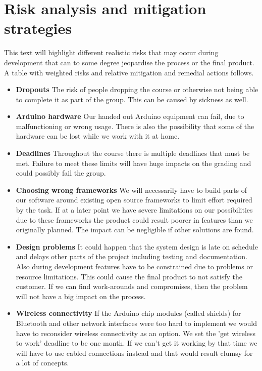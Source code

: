 \section{Risk analysis and mitigation strategies}

This text will highlight different realistic risks that may occur during development
that can to some degree jeopardise the process or the final product.
A table with weighted risks and relative mitigation and remedial actions follows.

\begin{itemize}

	\item \textbf{Dropouts}\newline
		The risk of people dropping the course or otherwise not being able to complete it as part
		of the group. This can be caused by sickness as well.

	\item \textbf{Arduino hardware}\newline
		Our handed out Arduino equipment can fail, due to malfunctioning or wrong usage.
		There is also the possibility that some of the hardware can be lost while we work with it at home.

	\item \textbf{Deadlines}\newline
		Throughout the course there is multiple deadlines that must be met. Failure to meet
		these limits will have huge impacts on the grading and could possibly fail the group.

	\item \textbf{Choosing wrong frameworks}\newline
		We will necessarily have to build parts of our software around existing open source
		frameworks to limit effort required by the task. If at a later point we have severe limitations
		on our possibilities due to these frameworks the product could result poorer in features than
		we originally planned. The impact can be negligible if other solutions are found.

	\item \textbf{Design problems}\newline
		It could happen that the system design is late on schedule and delays other parts of the project
		including testing and documentation. Also during development features have to be constrained due to problems
		or resource limitations. This could cause the final product to not satisfy the customer.
		If we can find work-arounds and compromises, then the problem will not have a big impact on the process.

	\item \textbf{Wireless connectivity}\newline
		If the Arduino chip modules (called shields) for Bluetooth and other network interfaces were too
		hard to implement we would have to reconsider wireless connectivity as an option.
		We set the 'get wireless to work' deadline to be one month. If we can't get it working
		by that time we will have to use cabled connections instead and that would result clumsy
		for a lot of concepts.
\end{itemize}

